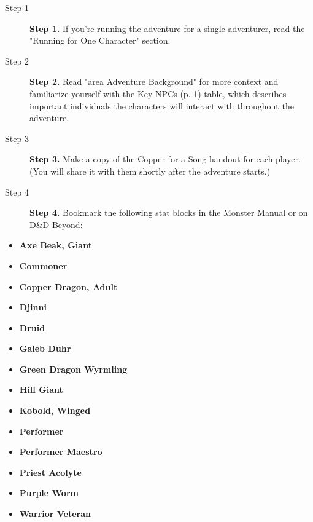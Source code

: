 \documentclass[letterpaper, 11pt, twocolumn]{dndbook}
\begin{document}
\begin{description}
\item[Step 1] \textbf{Step 1.} If you're running the adventure for a single adventurer, read the "Running for One Character" section.
\item[Step 2] \textbf{Step 2.} Read "area Adventure Background" for more context and familiarize yourself with the Key NPCs (p. 1) table, which describes important individuals the characters will interact with throughout the adventure.
\item[Step 3] \textbf{Step 3.} Make a copy of the Copper for a Song handout for each player. (You will share it with them shortly after the adventure starts.)
\item[Step 4] \textbf{Step 4.} Bookmark the following stat blocks in the Monster Manual or on D\&D Beyond:
\end{description}

\begin{itemize}
\item \textbf{Axe Beak, Giant}
\item \textbf{Commoner}
\item \textbf{Copper Dragon, Adult}
\item \textbf{Djinni}
\item \textbf{Druid}
\item \textbf{Galeb Duhr}
\item \textbf{Green Dragon Wyrmling}
\item \textbf{Hill Giant}
\item \textbf{Kobold, Winged}
\item \textbf{Performer}
\item \textbf{Performer Maestro}
\item \textbf{Priest Acolyte}
\item \textbf{Purple Worm}
\item \textbf{Warrior Veteran}
\end{itemize}
\end{document}
